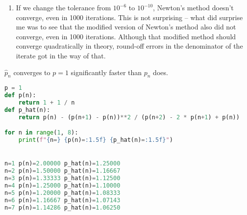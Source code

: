 \documentclass{article}
\begin{document}
\begin{enumerate}[label=(\alph*)]
\begin{lstlisting}[language=Python]
Modified Newton's method with x_0=1, tolerance=1e-06, max_iterations=1000
n=00  x_n=+1.00000000  residual=0.21828182845904509
n=01  x_n=-0.11308312  residual=0.00023435150458198
n=02  x_n=-0.00103017  residual=0.00000000018216402
n=03  x_n=-0.00000009  residual=0.00000000000000003
\end{lstlisting}

    \item If we change the tolerance from $10^{-6}$ to $10^{-10}$, Newton's method doesn't converge, even in 1000 iterations. This is not surprising -- what did surprise me was to see that the modified version of Newton's method also did not converge, even in 1000 iterations. Although that modified method should converge quadratically in theory, round-off errors in the denominator of the iterate got in the way of that.
\end{enumerate}


\bigskip
\begin{prob}
\end{prob}
$\hat{p}_n$ converges to $p=1$ significantly faster than $p_n$ does.
\begin{lstlisting}[language=Python]
p = 1
def p(n):
    return 1 + 1 / n
def p_hat(n):
    return p(n) - (p(n+1) - p(n))**2 / (p(n+2) - 2 * p(n+1) + p(n))

for n in range(1, 8):
    print(f"{n=} {p(n)=:1.5f} {p_hat(n)=:1.5f}")


n=1 p(n)=2.00000 p_hat(n)=1.25000
n=2 p(n)=1.50000 p_hat(n)=1.16667
n=3 p(n)=1.33333 p_hat(n)=1.12500
n=4 p(n)=1.25000 p_hat(n)=1.10000
n=5 p(n)=1.20000 p_hat(n)=1.08333
n=6 p(n)=1.16667 p_hat(n)=1.07143
n=7 p(n)=1.14286 p_hat(n)=1.06250
\end{lstlisting}
\end{document}
